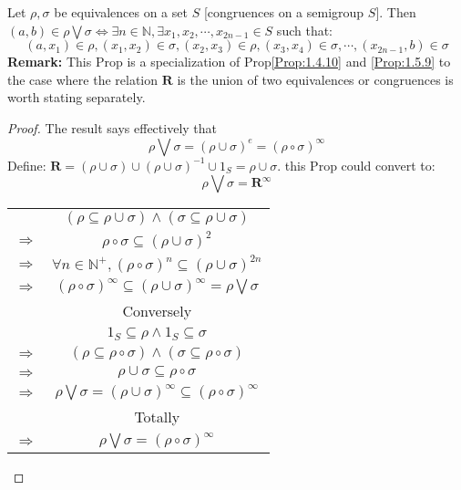 \begin{Prop}\label{Prop:1.5.11}
    Let $\rho, \sigma$ be equivalences on a set $S$ [congruences on a semigroup $S$]. Then $(a, b)\in \rho \bigvee \sigma \Leftrightarrow \exists n\in \mathbb{N}, \exists x_1, x_2, \cdots, x_{2n-1} \in S$ such that:
    \[
        (a, x_1)\in \rho, (x_1, x_2)\in \sigma, (x_2, x_3)\in \rho, (x_3, x_4)\in \sigma, \cdots, (x_{2n-1}, b) \in \sigma
    \]
    \textbf{Remark:}
    This Prop is a specialization of Prop\ref{Prop:1.4.10} and \ref{Prop:1.5.9} to the case where the relation $\mathbf{R}$ is the union of two equivalences or congruences is worth stating separately.

    \begin{proof}
        The result says effectively that
        \[
            \rho \bigvee \sigma = (\rho \cup \sigma)^e = (\rho \circ \sigma)^{\infty}
        \]
        Define: $\mathbf{R} = (\rho \cup \sigma)\cup (\rho \cup \sigma)^{-1}\cup 1_S = \rho \cup \sigma$.
        this Prop could convert to:
        \[\rho \bigvee \sigma = \mathbf{R}^{\infty}\]
        \begin{center}
            \begin{tabular}{c c}
                & $(\rho \subseteq \rho \cup \sigma) \wedge (\sigma \subseteq \rho \cup \sigma)$  \\
                $\Rightarrow$ & $\rho \circ \sigma \subseteq (\rho \cup \sigma)^2$  \\
                $\Rightarrow$ & $\forall n \in \mathbb{N}^+, (\rho \circ \sigma)^n \subseteq (\rho \cup \sigma)^{2n}$   \\
                $\Rightarrow$ & $(\rho \circ \sigma)^{\infty} \subseteq (\rho \cup \sigma)^{\infty} = \rho \bigvee \sigma$  \\
                & Conversely    \\
                & $1_S \subseteq \rho \wedge 1_S \subseteq \sigma$  \\
                $\Rightarrow$ & $(\rho \subseteq \rho \circ \sigma) \wedge (\sigma \subseteq \rho \circ \sigma)$    \\
                $\Rightarrow$ & $\rho \cup \sigma \subseteq \rho \circ \sigma$ \\
                $\Rightarrow$ & $\rho \bigvee \sigma = (\rho \cup \sigma)^{\infty} \subseteq (\rho \circ \sigma)^{\infty}$  \\
                & Totally   \\
                $\Rightarrow$ & $\rho \bigvee \sigma = (\rho \circ \sigma)^{\infty}$
            \end{tabular}
        \end{center}
    \end{proof}
\end{Prop}

